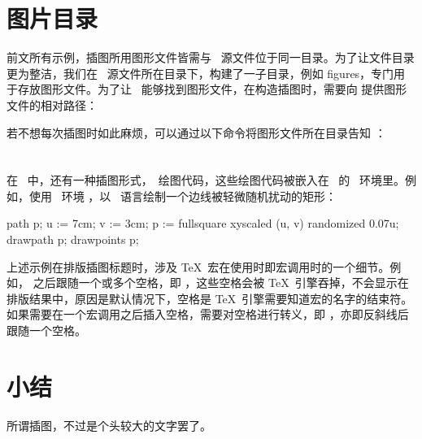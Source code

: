 \starttyping[option=TEX]
\stoptyping
{}

\section{图片目录}

前文所有示例，插图所用图形文件皆需与 \ConTeXt\ 源文件位于同一目录。为了让文件目录更为整洁，我们在 \ConTeXt\ 源文件所在目录下，构建了一子目录，例如 figures，专门用于存放图形文件。为了让 \ConTeXt\ 能够找到图形文件，在构造插图时，需要向 \type{\externalfigure} 提供图形文件的相对路径：

\starttyping[option=TEX]
\stoptyping

若不想每次插图时如此麻烦，可以通过以下命令将图形文件所在目录告知 \ConTeXt：

\starttyping[option=TEX]
\setupexternalfigures[directory={./figures}]
\stoptyping

\section{\MetaFun}

在 \ConTeXt\ 中，还有一种插图形式，\MetaPost\ 绘图代码，这些绘图代码被嵌入在 \ConTeXt\ 的 \MetaFun\ 环境里。例如，使用 \MetaFun\ 环境 ，以 \MetaPost\ 语言绘制一个边线被轻微随机扰动的矩形：

\starttyping[option=TEX]
path p;
u := 7cm; v := 3cm;
p := fullsquare xyscaled (u, v) randomized 0.07u;
drawpath p;
drawpoints p;
\stopuseMPgraphic
{}
\stoptyping
{}

上述示例在排版插图标题时，涉及 \TeX\ 宏在使用时即宏调用时的一个细节。例如，\type{\TeX} 之后跟随一个或多个空格，即 \type[space=on]{\TeX    }，这些空格会被 \TeX\ 引擎吞掉，不会显示在排版结果中，原因是默认情况下，空格是 \TeX\ 引擎需要知道宏的名字的结束符。如果需要在一个宏调用之后插入空格，需要对空格进行转义，即 \type[space=on]{\ }，亦即反斜线后跟随一个空格。

\section{小结}

所谓插图，不过是个头较大的文字罢了。

